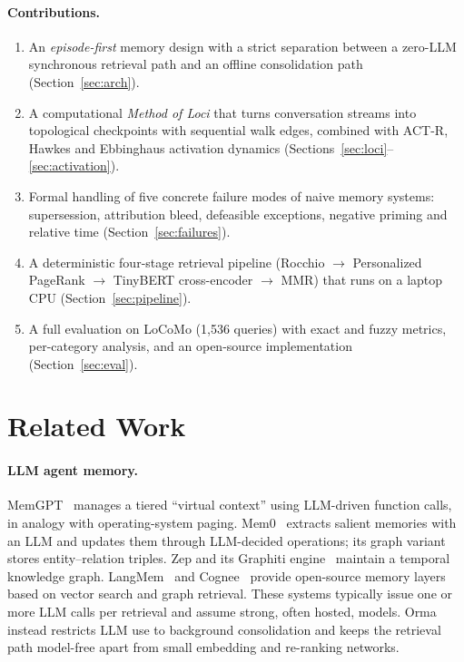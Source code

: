 \documentclass[11pt]{article}
\newcommand{\orma}{\mbox{Orma}}
\begin{document}
\paragraph{Contributions.}
\begin{enumerate}
    \item An \emph{episode-first} memory design with a strict separation between a zero-LLM synchronous retrieval path and an offline consolidation path (Section~\ref{sec:arch}).
    \item A computational \emph{Method of Loci} that turns conversation streams into topological checkpoints with sequential walk edges, combined with ACT-R, Hawkes and Ebbinghaus activation dynamics (Sections~\ref{sec:loci}--\ref{sec:activation}).
    \item Formal handling of five concrete failure modes of naive memory systems: supersession, attribution bleed, defeasible exceptions, negative priming and relative time (Section~\ref{sec:failures}).
    \item A deterministic four-stage retrieval pipeline (Rocchio $\rightarrow$ Personalized PageRank $\rightarrow$ TinyBERT cross-encoder $\rightarrow$ MMR) that runs on a laptop CPU (Section~\ref{sec:pipeline}).
    \item A full evaluation on LoCoMo (1,536 queries) with exact and fuzzy metrics, per-category analysis, and an open-source implementation (Section~\ref{sec:eval}).
\end{enumerate}

\section{Related Work}
\label{sec:related}

\paragraph{LLM agent memory.}
MemGPT~\cite{packer2023memgpt} manages a tiered ``virtual context'' using LLM-driven function calls, in analogy with operating-system paging.
Mem0~\cite{chhikara2025mem0} extracts salient memories with an LLM and updates them through LLM-decided operations; its graph variant stores entity--relation triples.
Zep and its Graphiti engine~\cite{rasmussen2025zep} maintain a temporal knowledge graph.
LangMem~\cite{langmem} and Cognee~\cite{cognee} provide open-source memory layers based on vector search and graph retrieval.
These systems typically issue one or more LLM calls per retrieval and assume strong, often hosted, models.
\orma{} instead restricts LLM use to background consolidation and keeps the retrieval path model-free apart from small embedding and re-ranking networks.
\end{document}
